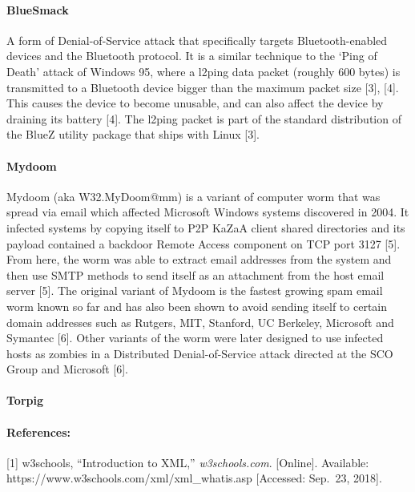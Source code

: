 \documentclass[11pt]{article}
\begin{document}
\hypertarget{bluesmack}{%
\paragraph{BlueSmack}\label{bluesmack}}

A form of Denial-of-Service attack that specifically targets
Bluetooth-enabled devices and the Bluetooth protocol. It is a similar
technique to the `Ping of Death' attack of Windows 95, where a l2ping
data packet (roughly 600 bytes) is transmitted to a Bluetooth device
bigger than the maximum packet size {[}3{]}, {[}4{]}. This causes the
device to become unusable, and can also affect the device by draining
its battery {[}4{]}. The l2ping packet is part of the standard
distribution of the BlueZ utility package that ships with Linux {[}3{]}.

\hypertarget{mydoom}{%
\paragraph{Mydoom}\label{mydoom}}

Mydoom (aka W32.MyDoom@mm) is a variant of computer worm that was spread
via email which affected Microsoft Windows systems discovered in 2004.
It infected systems by copying itself to P2P KaZaA client shared
directories and its payload contained a backdoor Remote Access component
on TCP port 3127 {[}5{]}. From here, the worm was able to extract email
addresses from the system and then use SMTP methods to send itself as an
attachment from the host email server {[}5{]}. The original variant of
Mydoom is the fastest growing spam email worm known so far and has also
been shown to avoid sending itself to certain domain addresses such as
Rutgers, MIT, Stanford, UC Berkeley, Microsoft and Symantec {[}6{]}.
Other variants of the worm were later designed to use infected hosts as
zombies in a Distributed Denial-of-Service attack directed at the SCO
Group and Microsoft {[}6{]}.

\hypertarget{torpig}{%
\paragraph{Torpig}\label{torpig}}

\hypertarget{references}{%
\paragraph{References:}\label{references}}

{[}1{]} w3schools, ``Introduction to XML,'' \emph{w3schools.com}.
{[}Online{]}. Available: https://www.w3schools.com/xml/xml\_whatis.asp
{[}Accessed: Sep.~23, 2018{]}.
\end{document}
